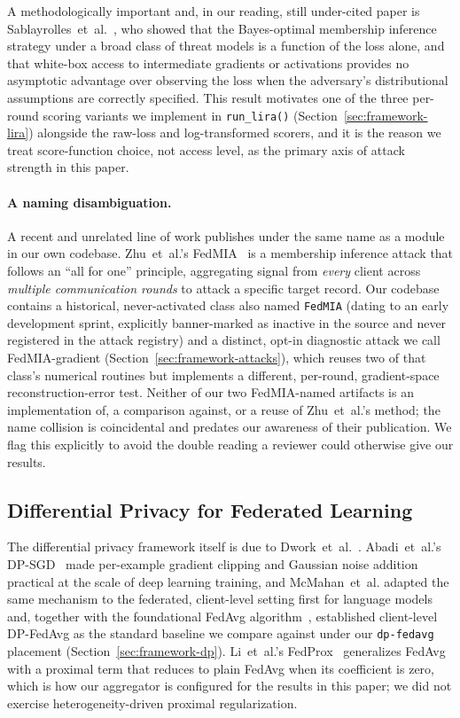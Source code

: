 A methodologically important and, in our reading, still under-cited
paper is Sablayrolles~et~al.~\cite{sablayrolles2019whitebox}, who
showed that the Bayes-optimal membership inference strategy under a
broad class of threat models is a function of the loss alone, and that
white-box access to intermediate gradients or activations provides no
asymptotic advantage over observing the loss when the adversary's
distributional assumptions are correctly specified. This result
motivates one of the three per-round scoring variants we implement in
\texttt{run\_lira()} (Section~\ref{sec:framework-lira}) alongside the
raw-loss and log-transformed scorers, and it is the reason we treat
score-function choice, not access level, as the primary axis of attack
strength in this paper.

\paragraph{A naming disambiguation.}
A recent and unrelated line of work publishes under the same name as a
module in our own codebase. Zhu~et~al.'s
FedMIA~\cite{zhu2025fedmia} is a membership inference attack that
follows an ``all for one'' principle, aggregating signal from
\emph{every} client across \emph{multiple communication rounds} to
attack a specific target record. Our codebase contains a historical,
never-activated class also named \texttt{FedMIA} (dating to an early
development sprint, explicitly banner-marked as inactive in the source
and never registered in the attack registry) and a distinct, opt-in
diagnostic attack we call FedMIA-gradient
(Section~\ref{sec:framework-attacks}), which reuses two of that
class's numerical routines but implements a different, per-round,
gradient-space reconstruction-error test. Neither of our two
FedMIA-named artifacts is an implementation of, a comparison against,
or a reuse of Zhu~et~al.'s method; the name collision is coincidental
and predates our awareness of their publication. We flag this
explicitly to avoid the double reading a reviewer could otherwise give
our results.

\subsection{Differential Privacy for Federated Learning}
\label{sec:related-dpfl}

The differential privacy framework itself is due to
Dwork~et~al.~\cite{dwork2006calibrating}. Abadi~et~al.'s
DP-SGD~\cite{abadi2016deep} made per-example gradient clipping and
Gaussian noise addition practical at the scale of deep learning
training, and McMahan~et~al. adapted the same mechanism to the
federated, client-level setting first for language
models~\cite{mcmahan2018learning} and, together with the foundational
FedAvg algorithm~\cite{mcmahan2017communication}, established
client-level DP-FedAvg as the standard baseline we compare against
under our \texttt{dp-fedavg} placement (Section~\ref{sec:framework-dp}).
Li~et~al.'s FedProx~\cite{li2020federated} generalizes FedAvg with a
proximal term that reduces to plain FedAvg when its coefficient is
zero, which is how our aggregator is configured for the results in
this paper; we did not exercise heterogeneity-driven proximal
regularization.

